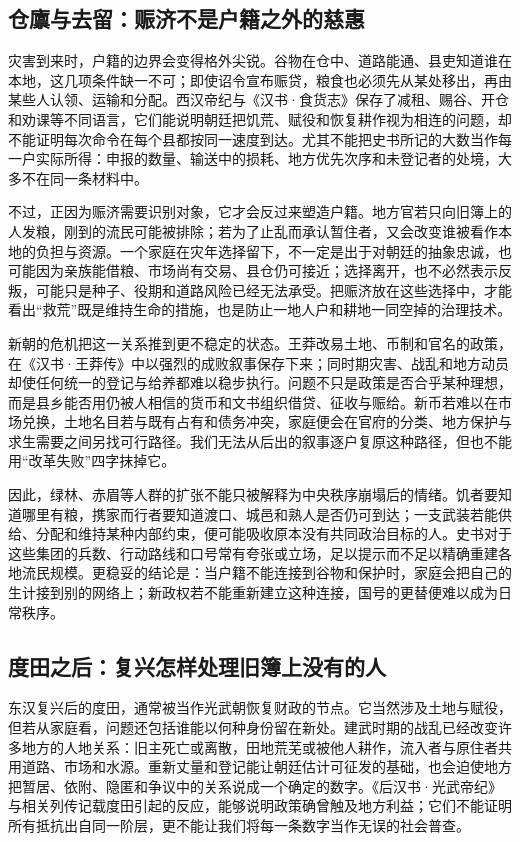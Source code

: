 \subsection{仓廪与去留：赈济不是户籍之外的慈惠}

灾害到来时，户籍的边界会变得格外尖锐。谷物在仓中、道路能通、县吏知道谁在本地，这几项条件缺一不可；即使诏令宣布赈贷，粮食也必须先从某处移出，再由某些人认领、运输和分配。西汉帝纪与《汉书·食货志》保存了减租、赐谷、开仓和劝课等不同语言，它们能说明朝廷把饥荒、赋役和恢复耕作视为相连的问题，却不能证明每次命令在每个县都按同一速度到达。尤其不能把史书所记的大数当作每一户实际所得：申报的数量、输送中的损耗、地方优先次序和未登记者的处境，大多不在同一条材料中。

不过，正因为赈济需要识别对象，它才会反过来塑造户籍。地方官若只向旧簿上的人发粮，刚到的流民可能被排除；若为了止乱而承认暂住者，又会改变谁被看作本地的负担与资源。一个家庭在灾年选择留下，不一定是出于对朝廷的抽象忠诚，也可能因为亲族能借粮、市场尚有交易、县仓仍可接近；选择离开，也不必然表示反叛，可能只是种子、役期和道路风险已经无法承受。把赈济放在这些选择中，才能看出“救荒”既是维持生命的措施，也是防止一地人户和耕地一同空掉的治理技术。

新朝的危机把这一关系推到更不稳定的状态。王莽改易土地、币制和官名的政策，在《汉书·王莽传》中以强烈的成败叙事保存下来；同时期灾害、战乱和地方动员却使任何统一的登记与给养都难以稳步执行。问题不只是政策是否合乎某种理想，而是县乡能否用仍被人相信的货币和文书组织借贷、征收与赈给。新币若难以在市场兑换，土地名目若与既有占有和债务冲突，家庭便会在官府的分类、地方保护与求生需要之间另找可行路径。我们无法从后出的叙事逐户复原这种路径，但也不能用“改革失败”四字抹掉它。

因此，绿林、赤眉等人群的扩张不能只被解释为中央秩序崩塌后的情绪。饥者要知道哪里有粮，携家而行者要知道渡口、城邑和熟人是否仍可到达；一支武装若能供给、分配和维持某种内部约束，便可能吸收原本没有共同政治目标的人。史书对于这些集团的兵数、行动路线和口号常有夸张或立场，足以提示而不足以精确重建各地流民规模。更稳妥的结论是：当户籍不能连接到谷物和保护时，家庭会把自己的生计接到别的网络上；新政权若不能重新建立这种连接，国号的更替便难以成为日常秩序。

\subsection{度田之后：复兴怎样处理旧簿上没有的人}

东汉复兴后的度田，通常被当作光武朝恢复财政的节点。它当然涉及土地与赋役，但若从家庭看，问题还包括谁能以何种身份留在新处。建武时期的战乱已经改变许多地方的人地关系：旧主死亡或离散，田地荒芜或被他人耕作，流入者与原住者共用道路、市场和水源。重新丈量和登记能让朝廷估计可征发的基础，也会迫使地方把暂居、依附、隐匿和争议中的关系说成一个确定的数字。《后汉书·光武帝纪》与相关列传记载度田引起的反应，能够说明政策确曾触及地方利益；它们不能证明所有抵抗出自同一阶层，更不能让我们将每一条数字当作无误的社会普查。

